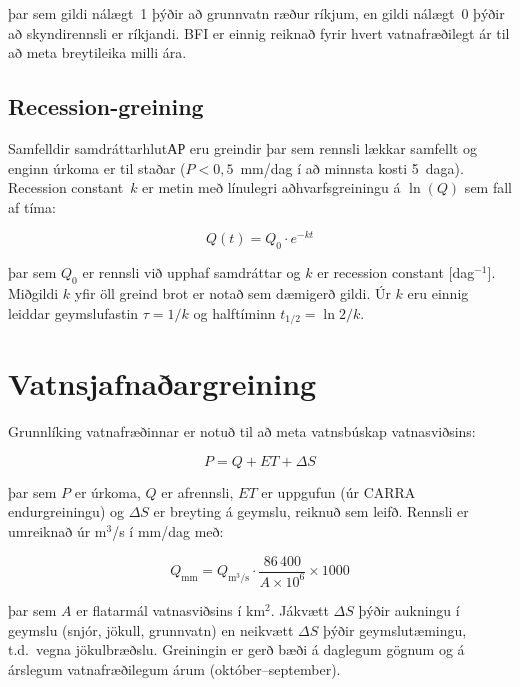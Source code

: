 \documentclass[12pt, a4paper]{article}
\begin{document}
þar sem gildi nálægt~1 þýðir að grunnvatn ræður ríkjum, en gildi nálægt~0
þýðir að skyndirennsli er ríkjandi. BFI er einnig reiknað fyrir hvert
vatnafræðilegt ár til að meta breytileika milli ára.

\subsection{Recession-greining}

Samfelldir samdráttarhlutАР eru greindir þar sem rennsli lækkar samfellt og
enginn úrkoma er til staðar ($P < 0{,}5$~mm/dag í að minnsta kosti 5~daga).
Recession constant~$k$ er metin með línulegri aðhvarfsgreiningu á $\ln(Q)$
sem fall af tíma:

\begin{equation}
    Q(t) = Q_0 \cdot e^{-kt}
    \label{eq:recession}
\end{equation}

þar sem $Q_0$ er rennsli við upphaf samdráttar og $k$ er recession constant
[dag$^{-1}$]. Miðgildi $k$ yfir öll greind brot er notað sem dæmigerð gildi.
Úr $k$ eru einnig leiddar geymslufastin $\tau = 1/k$ og halftíminn
$t_{1/2} = \ln 2 / k$.

\section{Vatnsjafnaðargreining}

Grunnlíking vatnafræðinnar er notuð til að meta vatnsbúskap vatnasviðsins:

\begin{equation}
    P = Q + ET + \Delta S
    \label{eq:water-balance}
\end{equation}

þar sem $P$ er úrkoma, $Q$ er afrennsli, $ET$ er uppgufun (úr CARRA
endurgreiningu) og $\Delta S$ er breyting á geymslu, reiknuð sem leifð.
Rennsli er umreiknað úr m$^3$/s í mm/dag með:

\begin{equation}
    Q_{\mathrm{mm}} = Q_{\mathrm{m^3/s}} \cdot \frac{86\,400}{A \times 10^6}
    \times 1000
    \label{eq:q-conversion}
\end{equation}

þar sem $A$ er flatarmál vatnasviðsins í km$^2$. Jákvætt $\Delta S$ þýðir
aukningu í geymslu (snjór, jökull, grunnvatn) en neikvætt $\Delta S$ þýðir
geymslutæmingu, t.d.\ vegna jökulbræðslu. Greiningin er gerð bæði á daglegum
gögnum og á árslegum vatnafræðilegum árum (október--september).
\end{document}
